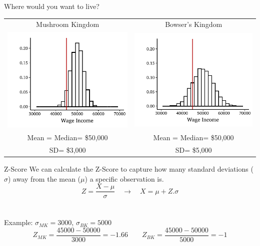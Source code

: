 \documentclass{./../div_teaching_slides}
\begin{document}
\begin{frame}{Where would you want to live?}
\centering \vspace{-0.5em}
\begin{tabular}{cc}
Mushroom Kingdom  & Bowser's Kingdom \\
\includegraphics{./../../Output/income_mk_z.pdf} &
\includegraphics{./../../Output/income_bk_z.pdf} \\ 
Mean = Median= \$50,000 & Mean = Median= \$50,000 \\
SD= \$3,000 & SD= \$5,000 \\
\end{tabular}
\end{frame}

\begin{frame}{Z-Score}
We can calculate the Z-Score to capture how many standard deviations ($\sigma$) away from the mean ($\mu$) a specific observation is. \\
$$ Z = \frac{X - \mu}{\sigma} \quad \rightarrow \quad X = \mu + Z.\sigma $$ \\~\\


Example: $\sigma_{MK} = 3000$, $\sigma_{BK} = 5000$ \\
 $$Z_{MK} = \frac{45000 - 50000}{3000} = -1.66 \quad \quad Z_{BK} = \frac{45000 - 50000}{5000} = -1$$ \\~\\
\end{frame}
\end{document}

